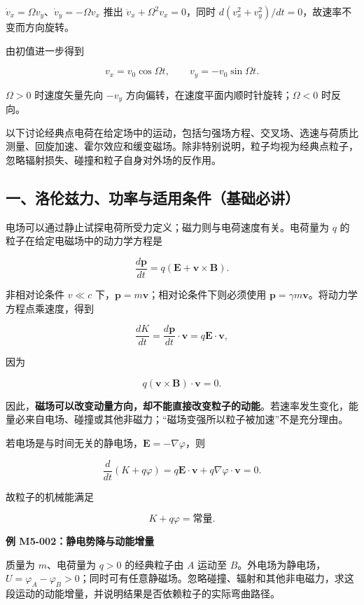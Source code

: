 \(\dot v_x=\Omega v_y\)、\(\dot v_y=-\Omega v_x\) 推出
\(\ddot v_x+\Omega^2v_x=0\)，同时
\(d(v_x^2+v_y^2)/dt=0\)，故速率不变而方向旋转。

由初值进一步得到

\[
v_x=v_0\cos\Omega t,\qquad v_y=-v_0\sin\Omega t.
\]

\(\Omega>0\) 时速度矢量先向 \(-v_y\)
方向偏转，在速度平面内顺时针旋转；\(\Omega<0\) 时反向。

以下讨论经典点电荷在给定场中的运动，包括匀强场方程、交叉场、选速与荷质比测量、回旋加速、霍尔效应和缓变磁场。除非特别说明，粒子均视为经典点粒子，忽略辐射损失、碰撞和粒子自身对外场的反作用。

\subsection{一、洛伦兹力、功率与适用条件（基础必讲）}\label{m5:ux4e00ux6d1bux4f26ux5179ux529bux529fux7387ux4e0eux9002ux7528ux6761ux4ef6ux57faux7840ux5fc5ux8bb2}

电场可以通过静止试探电荷所受力定义；磁力则与电荷速度有关。电荷量为 \(q\)
的粒子在给定电磁场中的动力学方程是

\[
\boxed{
\frac{d\mathbf p}{dt}
=q\left(\mathbf E+\mathbf v\times\mathbf B\right)
}.
\]

非相对论条件 \(v\ll c\)
下，\(\mathbf p=m\mathbf v\)；相对论条件下则必须使用
\(\mathbf p=\gamma m\mathbf v\)。将动力学方程点乘速度，得到

\[
\frac{dK}{dt}
=\frac{d\mathbf p}{dt}\cdot\mathbf v
=q\mathbf E\cdot\mathbf v,
\]

因为

\[
q(\mathbf v\times\mathbf B)\cdot\mathbf v=0.
\]

因此，\textbf{磁场可以改变动量方向，却不能直接改变粒子的动能}。若速率发生变化，能量必来自电场、碰撞或其他非磁力；``磁场变强所以粒子被加速''不是充分理由。

若电场是与时间无关的静电场，\(\mathbf E=-\nabla\varphi\)，则

\[
\frac{d}{dt}(K+q\varphi)
=q\mathbf E\cdot\mathbf v
+q\nabla\varphi\cdot\mathbf v
=0.
\]

故粒子的机械能满足

\[
\boxed{K+q\varphi=\text{常量}}.
\]

\par{}
\noindent\begin{minipage}{\linewidth}

\textbf{例 M5-002：静电势降与动能增量}

质量为 \(m\)、电荷量为 \(q>0\) 的经典粒子由 \(A\) 运动至
\(B\)。外电场为静电场，\(U=\varphi_A-\varphi_B>0\)；同时可有任意静磁场。忽略碰撞、辐射和其他非电磁力，求这段运动的动能增量，并说明结果是否依赖粒子的实际弯曲路径。

\end{minipage}\par

